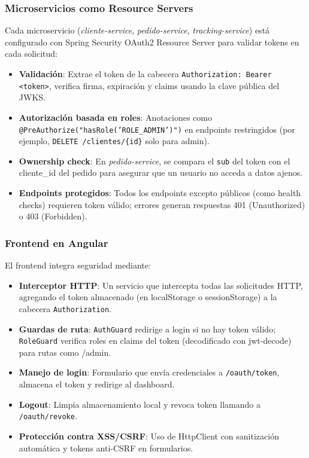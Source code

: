 \documentclass[a4paper,12pt]{article}
\begin{document}
\subsubsection{Microservicios como Resource Servers}
Cada microservicio (\textit{cliente-service}, \textit{pedido-service}, \textit{tracking-service}) está configurado con Spring Security OAuth2 Resource Server para validar tokens en cada solicitud:
\begin{itemize}
    \item \textbf{Validación}: Extrae el token de la cabecera \texttt{Authorization: Bearer <token>}, verifica firma, expiración y claims usando la clave pública del JWKS.
    \item \textbf{Autorización basada en roles}: Anotaciones como \texttt{@PreAuthorize("hasRole('ROLE_ADMIN')")} en endpoints restringidos (por ejemplo, \texttt{DELETE /clientes/\{id\}} solo para admin).
    \item \textbf{Ownership check}: En \textit{pedido-service}, se compara el \texttt{sub} del token con el cliente_id del pedido para asegurar que un usuario no acceda a datos ajenos.
    \item \textbf{Endpoints protegidos}: Todos los endpoints excepto públicos (como health checks) requieren token válido; errores generan respuestas 401 (Unauthorized) o 403 (Forbidden).
\end{itemize}

\subsubsection{Frontend en Angular}
El frontend integra seguridad mediante:
\begin{itemize}
    \item \textbf{Interceptor HTTP}: Un servicio que intercepta todas las solicitudes HTTP, agregando el token almacenado (en localStorage o sessionStorage) a la cabecera \texttt{Authorization}.
    \item \textbf{Guardas de ruta}: \texttt{AuthGuard} redirige a login si no hay token válido; \texttt{RoleGuard} verifica roles en claims del token (decodificado con jwt-decode) para rutas como /admin.
    \item \textbf{Manejo de login}: Formulario que envía credenciales a \texttt{/oauth/token}, almacena el token y redirige al dashboard.
    \item \textbf{Logout}: Limpia almacenamiento local y revoca token llamando a \texttt{/oauth/revoke}.
    \item \textbf{Protección contra XSS/CSRF}: Uso de HttpClient con sanitización automática y tokens anti-CSRF en formularios.
\end{itemize}
\end{document}

